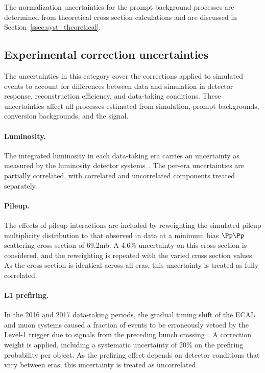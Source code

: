 The normalization uncertainties for the prompt background processes are determined from theoretical cross section calculations and are discussed in Section~\ref{ssec:syst_theoretical}.

\subsection{Experimental correction uncertainties}
\label{ssec:syst_experimental}

The uncertainties in this category cover the corrections applied to simulated events to account for differences between data and simulation in detector response, reconstruction efficiency, and data-taking conditions. These uncertainties affect all processes estimated from simulation, prompt backgrounds, conversion backgrounds, and the signal.

\paragraph{Luminosity.}
The integrated luminosity in each data-taking era carries an uncertainty as measured by the luminosity detector systems~\cite{CMS:2021xjt,CMS:2018elu,CMS:2019jhp,CMS:2024onh,CMS:2024vfh}. The per-era uncertainties are partially correlated, with correlated and uncorrelated components treated separately.

\paragraph{Pileup.}
The effects of pileup interactions are included by reweighting the simulated pileup multiplicity distribution to that observed in data at a minimum bias $\Pp\Pp$ scattering cross section of 69.2\unit{mb}. A 4.6\% uncertainty on this cross section is considered, and the reweighting is repeated with the varied cross section values. As the cross section is identical across all eras, this uncertainty is treated as fully correlated.

\paragraph{L1 prefiring.}
In the 2016 and 2017 data-taking periods, the gradual timing shift of the ECAL and muon systems caused a fraction of events to be erroneously vetoed by the Level-1 trigger due to signals from the preceding bunch crossing~\cite{CMS:2020cmk}. A correction weight is applied, including a systematic uncertainty of 20\% on the prefiring probability per object. As the prefiring effect depends on detector conditions that vary between eras, this uncertainty is treated as uncorrelated.

